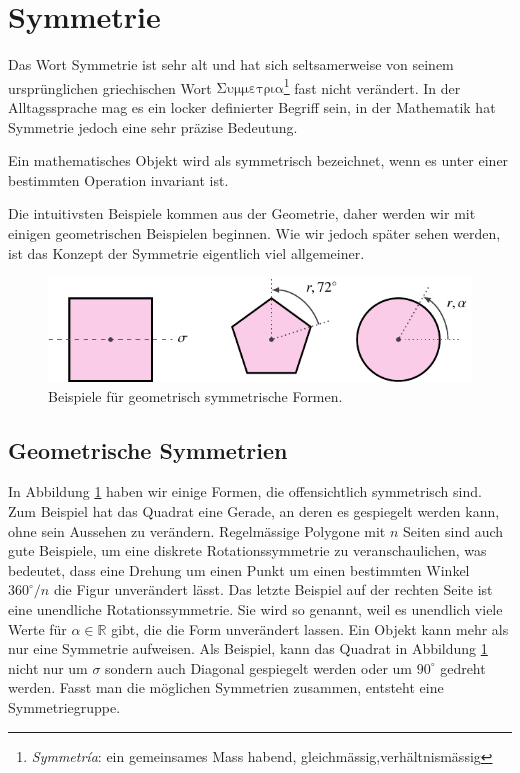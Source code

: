 \section{Symmetrie}
Das Wort Symmetrie ist sehr alt und hat sich seltsamerweise von seinem
ursprünglichen griechischen Wort \(\mathrm{\Sigma\upsilon\mu\mu\varepsilon\tau\rho\iota\alpha}\)\footnote{\emph{Symmetr\'ia}: ein gemeinsames Mass habend, gleichmässig,verhältnismässig} fast nicht verändert.
In der Alltagssprache mag es ein locker definierter Begriff sein, in der Mathematik hat Symmetrie jedoch eine sehr präzise Bedeutung.
\begin{definition}[Symmetrie]
  Ein mathematisches Objekt wird als symmetrisch bezeichnet, wenn es unter einer bestimmten Operation invariant ist.
\end{definition}
Die intuitivsten Beispiele kommen aus der Geometrie, daher werden wir mit einigen geometrischen Beispielen beginnen.
Wie wir jedoch später sehen werden, ist das Konzept der Symmetrie eigentlich viel allgemeiner.

\begin{figure}
  \centering
  \includegraphics{papers/punktgruppen/figures/symmetric-shapes}
  \caption{
    Beispiele für geometrisch symmetrische Formen.
    \label{fig:punktgruppen:geometry-example}
  }
\end{figure}

\subsection{Geometrische Symmetrien}

In Abbildung \ref{fig:punktgruppen:geometry-example} haben wir einige Formen, die offensichtlich symmetrisch sind.
Zum Beispiel hat das Quadrat eine Gerade, an deren es gespiegelt werden kann, ohne sein Aussehen zu verändern.
Regelmässige Polygone mit \(n\) Seiten sind auch gute Beispiele, um eine diskrete Rotationssymmetrie zu veranschaulichen, was bedeutet, dass eine Drehung um einen Punkt um einen bestimmten Winkel \(360^\circ/n\) die Figur unverändert lässt.
Das letzte Beispiel auf der rechten Seite ist eine unendliche Rotationssymmetrie. Sie wird so genannt, weil es unendlich viele Werte für \(\alpha \in \mathbb{R}\) gibt, die die Form unverändert lassen.
Ein Objekt kann mehr als nur eine Symmetrie aufweisen.
Als Beispiel, kann das Quadrat in Abbildung \ref{fig:punktgruppen:geometry-example} nicht nur um \(\sigma\) sondern auch Diagonal gespiegelt werden oder um \(90^\circ\) gedreht werden.
Fasst man die möglichen Symmetrien zusammen, entsteht eine Symmetriegruppe.

